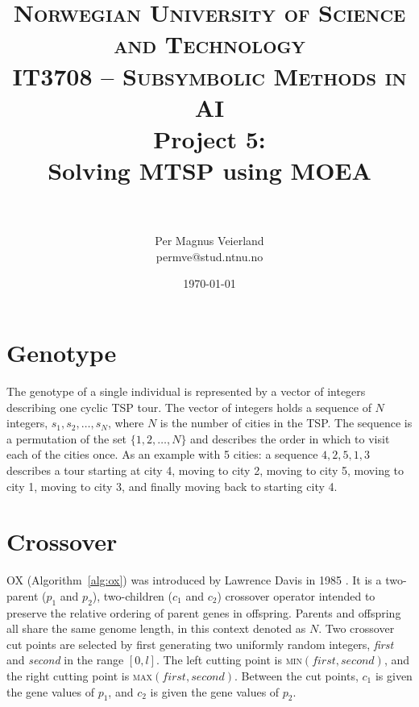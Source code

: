 

\usepackage{algorithm, algpseudocode}
\usepackage{float}
\usepackage{pgfplots, pgfplotstable}


\title{
\normalfont \normalsize
\textsc{Norwegian University of Science and Technology\\IT3708 -- Subsymbolic Methods in AI}
\horrule{0.5pt} \\[0.4cm]
\huge Project 5:\\ Solving \ac{MTSP} using \ac{MOEA}\\
\horrule{2pt} \\[0.5cm]
}

\author{Per Magnus Veierland\\permve@stud.ntnu.no}

\date{\normalsize\today}



\fancyfoot[C]{}
\maketitle

\section*{Genotype}

The genotype of a single individual is represented by a vector of integers describing one cyclic \ac{TSP} tour. The vector of integers holds a sequence of $N$ integers, $s_1, s_2, \dots, s_N$, where $N$ is the number of cities in the \ac{TSP}. The sequence is a permutation of the set $\{1, 2, \ldots, N\}$ and describes the order in which to visit each of the cities once. As an example with 5 cities: a sequence $4, 2, 5, 1, 3$ describes a tour starting at city 4, moving to city 2, moving to city 5, moving to city 1, moving to city 3, and finally moving back to starting city 4.

\section*{Crossover}

\setlength\parindent{17pt}

\ac{OX} (Algorithm~\ref{alg:ox}) was introduced by Lawrence Davis in 1985 \cite{davis1985applying}. It is a two-parent ($p_1$ and $p_2$), two-children ($c_1$ and $c_2$) crossover operator intended to preserve the relative ordering of parent genes in offspring. Parents and offspring all share the same genome length, in this context denoted as $N$. Two crossover cut points are selected by first generating two uniformly random integers, \textit{first} and \textit{second} in the range $[0,l]$. The left cutting point is \textsc{min}$(\textit{first}, \textit{second})$, and the right cutting point is \textsc{max}$(\textit{first}, \textit{second})$. Between the cut points, $c_1$ is given the gene values of $p_1$, and $c_2$ is given the gene values of $p_2$.

